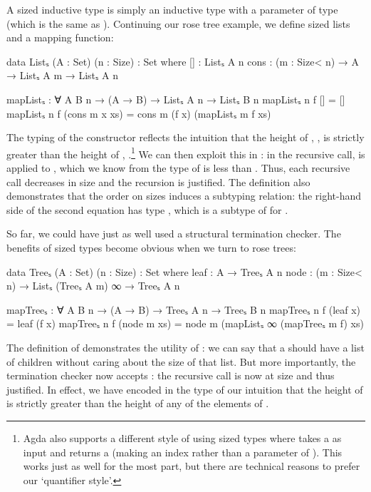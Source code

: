 A sized inductive type is simply an inductive type with a parameter of type
 (which is the same as ). Continuing our rose tree
example, we define sized lists and a mapping function:
\begin{code}
  data Listₛ (A : Set) (n : Size) : Set where
    []   : Listₛ A n
    cons : (m : Size< n) → A → Listₛ A m → Listₛ A n

  mapListₛ : ∀ {A B} n → (A → B) → Listₛ A n → Listₛ B n
  mapListₛ n f []            = []
  mapListₛ n f (cons m x xs) = cons m (f x) (mapListₛ m f xs)
\end{code}
The typing of the  constructor reflects the intuition that the
height of , , is strictly greater than the height of
, .\footnote{Agda also supports a different style of using
  sized types where  takes a  as input and returns
  a  (making  an index rather than a parameter of
  ). This works just as well for the most part, but there are
  technical reasons to prefer our \enquote*{quantifier style}.} We can then
exploit this in : in the recursive call,  is
applied to , which we know from the type of  is less than
. Thus, each recursive call decreases in size and the recursion is
justified. The definition also demonstrates that the order on sizes induces a
subtyping relation: the right-hand side of the second equation has type
, which is a subtype of  for .

So far, we could have just as well used a structural termination checker. The
benefits of sized types become obvious when we turn to rose trees:
\begin{code}
  data Treeₛ (A : Set) (n : Size) : Set where
    leaf : A → Treeₛ A n
    node : (m : Size< n) → Listₛ (Treeₛ A m) ∞ → Treeₛ A n

  mapTreeₛ : ∀ {A B} n → (A → B) → Treeₛ A n → Treeₛ B n
  mapTreeₛ n f (leaf x)    = leaf (f x)
  mapTreeₛ n f (node m xs) = node m (mapListₛ ∞ (mapTreeₛ m f) xs)
\end{code}
The definition of  demonstrates the utility of : we can
say that a  should have a list of children without caring about the
size of that list. But more importantly, the termination checker now accepts
: the recursive call is now at size  and thus
justified. In effect, we have encoded in the type of  our intuition
that the height of  is strictly greater than the height of any of
the elements of .

